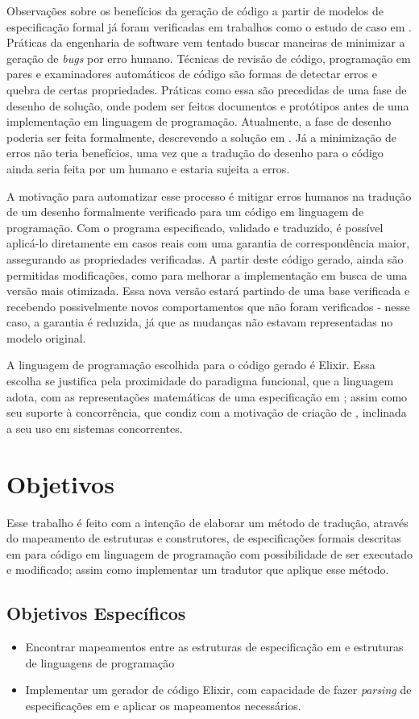 Observações sobre os benefícios da geração de código a partir de modelos de especificação formal já foram verificadas em trabalhos como o estudo de caso em \cite{Leonard2008}. Práticas da engenharia de software vem tentado buscar maneiras de minimizar a geração de \textit{bugs} por erro humano. Técnicas de revisão de código, programação em pares e examinadores automáticos de código são formas de detectar erros e quebra de certas propriedades. Práticas como essa são precedidas de uma fase de desenho de solução, onde podem ser feitos documentos e protótipos antes de uma implementação em linguagem de programação. Atualmente, a fase de desenho poderia ser feita formalmente, descrevendo a solução em \TLAA. Já a minimização de erros não teria benefícios, uma vez que a tradução do desenho para o código ainda seria feita por um humano e estaria sujeita a erros.

A motivação para automatizar esse processo é mitigar erros humanos na tra\-du\-ção de um desenho formalmente verificado para um código em linguagem de programação. Com o programa especificado, validado e traduzido, é possível aplicá-lo diretamente em casos reais com uma garantia de correspondência maior, assegurando as propriedades verificadas. A partir deste código gerado, ainda são permitidas modificações, como para melhorar a implementação em busca de uma versão mais otimizada. Essa nova versão estará partindo de uma base verificada e recebendo possivelmente novos comportamentos que não foram verificados - nesse caso, a garantia é reduzida, já que as mudanças não estavam representadas no modelo original.

A linguagem de programação escolhida para o código gerado é Elixir. Essa escolha se justifica pela proximidade do paradigma funcional, que a linguagem adota, com as representações matemáticas de uma especificação em \TLAA; assim como seu suporte à concorrência, que condiz com a motivação de criação de \TLAA, inclinada a seu uso em sistemas concorrentes.

\section{Objetivos}

Esse trabalho é feito com a intenção de elaborar um método de tradução, através do mapeamento de estruturas e construtores, de especificações formais descritas em \TLA para código em linguagem de programação com possibilidade de ser executado e modificado; assim como implementar um tradutor que aplique esse método.

\subsection{Objetivos Específicos}
\begin{itemize}
  \item Encontrar mapeamentos entre as estruturas de especificação em \TLA e estruturas de linguagens de programação
  \item Implementar um gerador de código Elixir, com capacidade de fazer \textit{parsing} de especificações em \TLA e aplicar os mapeamentos necessários.
\end{itemize}
